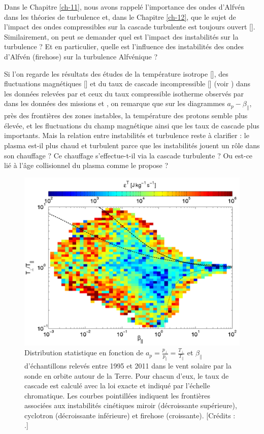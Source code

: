 Dans le Chapitre \ref{ch-11}, nous avons rappelé l'importance des ondes d'Alfvén dans les théories de turbulence et, dans le Chapitre \ref{ch-12}, que le sujet de l'impact des ondes compressibles  sur la cascade turbulente est toujours ouvert [\cite{brodiano_spatiotemporal_2021}]. Similairement, on peut se demander quel est l'impact des instabilités sur la turbulence ? Et en particulier, quelle est l'influence des instabilités des ondes d'Alfvén (firehose) sur la turbulence Alfvénique ? 

 Si l'on regarde les résultats des études de la température isotrope [\cite{liu_thermodynamic_2006}], des fluctuations magnétiques [\cite{bale_magnetic_2009}] et du taux de cascade incompressible [\cite{osman_proton_2013}] (voir ) dans les données relevées par  et ceux du taux compressible isotherme observés par \cite{hadid_compressible_2018} dans les données des missions  et , on remarque que sur les diagrammes $a_p-\beta_{\parallel}$, près des frontières des zones instables, la température des protons semble plus élevée, et les fluctuations du champ magnétique ainsi que les taux de cascade plus importants. Mais la relation entre instabilités et turbulence reste à clarifier : le plasma est-il plus chaud et turbulent parce que les instabilités jouent un rôle dans son chauffage ? Ce chauffage s'effectue-t-il via la cascade turbulente ? Ou est-ce lié à l'âge collisionnel du plasma comme le propose \cite{bale_magnetic_2009} ?
\begin{figure}[!ht]
 \centering
\includegraphics[width=0.8\linewidth,trim=0cm 0cm 0cm 0cm, clip=true]{./Mainmatter/Part_2/images/osman_2013}
\cprotect\caption{Distribution statistique en fonction de \ensuremath{a_p = \frac{p_{\perp}}{p_{\parallel}} =  \frac{T_{\perp}}{T_{\parallel}}} et \ensuremath{\beta_{\parallel}} d'échantillons relevés entre 1995 et 2011 dans le vent solaire par la sonde  en orbite autour de la Terre. Pour chacun d'eux, le taux de cascade est calculé avec la loi exacte  et indiqué par l'échelle chromatique. Les courbes pointillées indiquent les frontières associées aux instabilités cinétiques miroir (décroissante supérieure), cyclotron (décroissante inférieure) et firehose (croissante). [Crédits : \cite{osman_proton_2013}.]}
\label{fig:diag_osman}
\end{figure}

